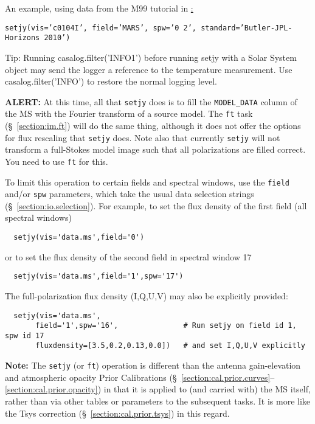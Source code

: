 An example, using data from the M99 tutorial in 
\href{http://casaguides.nrao.edu/index.php?title=CARMA_spectral_line_mosaic_M99}:

{\tt setjy(vis='c0104I', field='MARS', spw='0~2', standard='Butler-JPL-Horizons 2010')}

Tip: Running casalog.filter('INFO1') before running setjy with a Solar
System object may send the logger a reference to the temperature
measurement.  Use casalog.filter('INFO') to restore the normal logging
level.


{\bf ALERT:} At this time, all that {\tt setjy} does is to fill
the {\tt MODEL\_DATA} column of the MS with the Fourier transform of
a source model.  The {\tt ft} task (\S~\ref{section:im.ft})
will do the same thing, although it does not offer the options for
flux rescaling that {\tt setjy} does.  Note also that currently 
{\tt setjy} will not transform a full-Stokes model image such that all
polarizations are filled correct.  You need to use {\tt ft} for this.

To limit this operation to certain fields and spectral windows, use
the {\tt field} and/or {\tt spw} parameters, which take the usual
data selection strings (\S~\ref{section:io.selection}). For example, 
to set the flux density of the first field (all spectral windows)
\small
\begin{verbatim}
  setjy(vis='data.ms',field='0')
\end{verbatim}
\normalsize
or to set the flux density of the second field in spectral window 17
\small
\begin{verbatim}
  setjy(vis='data.ms',field='1',spw='17')
\end{verbatim}
\normalsize
The full-polarization flux density (I,Q,U,V) may also be explicitly provided:
\small
\begin{verbatim}
  setjy(vis='data.ms',
       field='1',spw='16',               # Run setjy on field id 1, spw id 17
       fluxdensity=[3.5,0.2,0.13,0.0])   # and set I,Q,U,V explicitly
\end{verbatim}
\normalsize

{\bf Note:} The {\tt setjy} (or {\tt ft}) operation is different than
the antenna gain-elevation and atmospheric opacity Prior Calibrations 
(\S~\ref{section:cal.prior.curves}--\ref{section:cal.prior.opacity})
in that it is applied to (and carried with) the MS itself, rather than
via other tables or parameters to the subsequent tasks.  It is more
like the Tsys correction (\S~\ref{section:cal.prior.tsys}) in this
regard.




